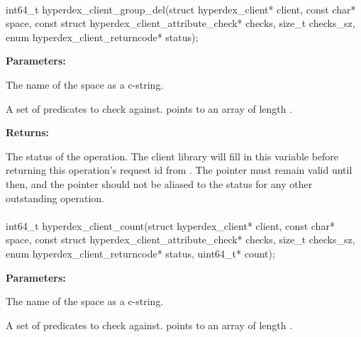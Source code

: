 \paragraph{}
\label{api:c:group_del}
\begin{ccode}
int64_t hyperdex_client_group_del(struct hyperdex_client* client,
                const char* space,
                const struct hyperdex_client_attribute_check* checks, size_t checks_sz,
                enum hyperdex_client_returncode* status);
\end{ccode}
\funcdesc 

\noindent\textbf{Parameters:}
\begin{description}[labelindent=\widthof{{\code{checks}, \code{checks\_sz}}},leftmargin=*,noitemsep,nolistsep,align=right]
\item[\code{space}] The name of the space as a c-string.
\item[\code{checks}, \code{checks\_sz}] A set of predicates to check against.   points to an array of length .
\end{description}

\noindent\textbf{Returns:}
\begin{description}[labelindent=\widthof{{\code{status}}},leftmargin=*,noitemsep,nolistsep,align=right]
\item[\code{status}] The status of the operation.  The client library will fill in this variable before returning this operation's request id from .  The pointer must remain valid until then, and the pointer should not be aliased to the status for any other outstanding operation.
\end{description}

\paragraph{}
\label{api:c:count}
\begin{ccode}
int64_t hyperdex_client_count(struct hyperdex_client* client,
                const char* space,
                const struct hyperdex_client_attribute_check* checks, size_t checks_sz,
                enum hyperdex_client_returncode* status,
                uint64_t* count);
\end{ccode}
\funcdesc 

\noindent\textbf{Parameters:}
\begin{description}[labelindent=\widthof{{\code{checks}, \code{checks\_sz}}},leftmargin=*,noitemsep,nolistsep,align=right]
\item[\code{space}] The name of the space as a c-string.
\item[\code{checks}, \code{checks\_sz}] A set of predicates to check against.   points to an array of length .
\end{description}

